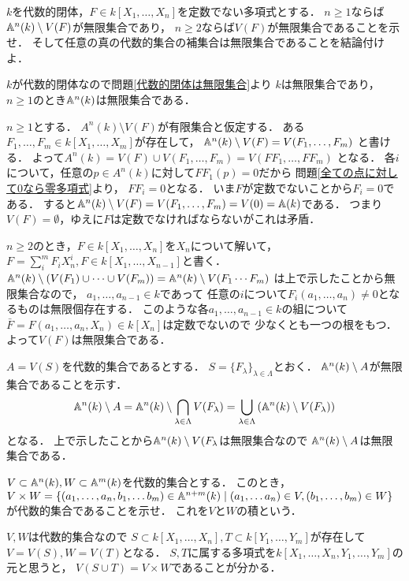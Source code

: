 \begin{prob}
  $k$を代数的閉体，$F\in k[X_1,\dots,X_n]$を定数でない多項式とする．
  $n\ge 1$ならば$\mathbb{A}^n(k) \setminus V(F)$が無限集合であり，
  $n\ge 2$ならば$V(F)$が無限集合であることを示せ．
  そして任意の真の代数的集合の補集合は無限集合であることを結論付けよ．
\end{prob}
\begin{ans}
  $k$が代数的閉体なので問題\ref{代数的閉体は無限集合}より
  $k$は無限集合であり，$n\ge 1$のとき$\mathbb{A}^n(k)$は無限集合である．
  
  $n\ge 1$とする．
  $A^n(k) \setminus V(F)$が有限集合と仮定する．
  ある$F_1, \dots, F_m \in k[X_1, \dots, X_m]$が存在して，
  $\mathbb{A}^n(k) \setminus V(F) = V(F_1, \dots , F_m)$
  と書ける．
  よって$A^n(k) = V(F) \cup V(F_1, \dots , F_m) = V( FF_1, \dots, FF_m)$
  となる．
  各$i$について，任意の$p \in A^n(k)$に対して$FF_1(p) = 0$だから
  問題\ref{全ての点に対して0なら零多項式}より，
  $FF_i = 0$となる．
  いま$F$が定数でないことから$F_i = 0$である．
  すると$\mathbb{A}^n(k) \setminus V(F) = V(F_1, \dots , F_m) = V(0) = \mathbb{A}(k)$である．
  つまり$V(F) = \emptyset$，ゆえに$F$は定数でなければならないがこれは矛盾．

  $n \ge 2$のとき，$F \in k[X_1,\dots,X_n]$を$X_n$について解いて，
  $F = \sum_{i}^m F_i X_n^i, F \in k[X_1,\dots,X_{n-1}]$と書く．
  $\mathbb{A}^n(k) \setminus (V(F_1) \cup \cdots \cup V(F_m)) = \mathbb{A}^n(k) \setminus V( F_1\cdots F_m )$
  は上で示したことから無限集合なので，
  $a_1, \dots, a_{n-1} \in k$であって
  任意の$i$について$F_i(a_1, \dots, a_n) \ne 0$となるものは無限個存在する．
  このような各$a_1, \dots, a_{n-1} \in k$の組について
  $\bar{F} = F(a_1, \dots, a_n, X_n) \in k[X_n]$は定数でないので
  少なくとも一つの根をもつ．
  よって$V(F)$は無限集合である．

  $A = V(S)$を代数的集合であるとする．
  $S = \{ F_{\lambda} \}_{\lambda\in\Lambda}$とおく．
  $\mathbb{A}^n(k) \setminus A$が無限集合であることを示す．
  \[ \mathbb{A}^n(k) \setminus A
  = \mathbb{A}^n(k) \setminus \bigcap_{\lambda\in\Lambda} V(F_{\lambda})
  = \bigcup_{\lambda\in\Lambda} \left( \mathbb{A}^n(k) \setminus V(F_{\lambda}) \right) \]
  となる．
  上で示したことから$\mathbb{A}^n(k) \setminus V(F_{\lambda}$は無限集合なので
  $ \mathbb{A}^n(k) \setminus A$は無限集合である．
\end{ans}

\begin{prob}
  $V \subset \mathbb{A}^{n}(k), W\subset \mathbb{A}^m(k)$を代数的集合とする．
  このとき，
  $V\times W = \{ (a_1, \dots, a_n, b_1, \dots b_m) \in \mathbb{A}^{n+m}(k) \mid (a_1, \dots a_n) \in V, (b_1, \dots, b_m) \in W \}$
  が代数的集合であることを示せ．
  これを$V$と$W$の積という．
\end{prob}
\begin{ans}
  $V,W$は代数的集合なので
  $S\subset k[X_1,\dots,X_n], T \subset k[Y_1, \dots, Y_m]$が存在して
  $V = V( S ), W = V( T )$となる．
  $S,T$に属する多項式を$k[X_1,\dots,X_n,Y_1,\dots,Y_m]$の元と思うと，
  $V(S \cup T) = V \times W$であることが分かる．
\end{ans}
